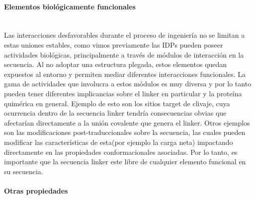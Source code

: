 \paragraph{Elementos biológicamente funcionales} \hspace{0pt} \\
Las interacciones desfavorables durante el proceso de ingeniería no se limitan a estas uniones estables, como vimos previamente las IDPs pueden poseer actividades biológicas, 
principalmente a través de módulos de interacción en la secuencia. 
Al no adoptar una estructura plegada, estos elementos quedan expuestos al entorno y permiten mediar diferentes interacciones funcionales.
La gama de actividades que involucra a estos módulos es muy diversa y por lo tanto pueden tener diferentes implicancias sobre el linker en particular y la proteína quimérica en general.
Ejemplo de esto son los sitios target de clivaje, cuya ocurrencia dentro de la secuencia linker tendría consecuencias obvias que afectarían directamente a la unión covalente que genera el linker.
Otros ejemplos son las modificaciones post-traduccionales sobre la secuencia, las cuales pueden modificar las características de esta(por ejemplo la carga neta) impactando directamente en las propiedades conformacionales asociadas.
Por lo tanto, es importante que la secuencia linker este libre de cualquier elemento funcional en su secuencia. 




\paragraph{Otras propiedades} \hspace{0pt} \\

